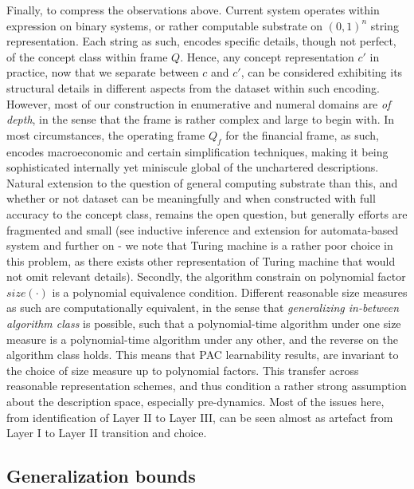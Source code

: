 Finally, to compress the observations above. Current system operates within expression on binary systems, or rather computable substrate on $(0,1)^{n}$ string representation. Each string as such, encodes specific details, though not perfect, of the concept class within frame $Q$. Hence, any concept representation $c'$ in practice, now that we separate between $c$ and $c'$, can be considered exhibiting its structural details in different aspects from the dataset within such encoding. However, most of our construction in enumerative and numeral domains are \textit{of depth}, in the sense that the frame is rather complex and large to begin with. In most circumstances, the operating frame $Q_{f}$ for the financial frame, as such, encodes macroeconomic and certain simplification techniques, making it being sophisticated internally yet miniscule global of the unchartered descriptions. Natural extension to the question of general computing substrate than this, and whether or not dataset can be meaningfully and when constructed with full accuracy to the concept class, remains the open question, but generally efforts are fragmented and small (see inductive inference and extension for automata-based system and further on - we note that Turing machine is a rather poor choice in this problem, as there exists other representation of Turing machine that would not omit relevant details). Secondly, the algorithm constrain on polynomial factor $size(\cdot)$ is a polynomial equivalence condition. Different reasonable size measures as such are computationally equivalent, in the sense that \textit{generalizing in-between algorithm class} is possible, such that a polynomial-time algorithm under one size measure is a polynomial-time algorithm under any other, and the reverse on the algorithm class holds. This means that PAC learnability results, are invariant to the choice of size measure up to polynomial factors. This transfer across reasonable representation schemes, and thus condition a rather strong assumption about the description space, especially pre-dynamics. Most of the issues here, from identification of Layer II to Layer III, can be seen almost as artefact from Layer I to Layer II transition and choice. 

\subsection{Generalization bounds}


